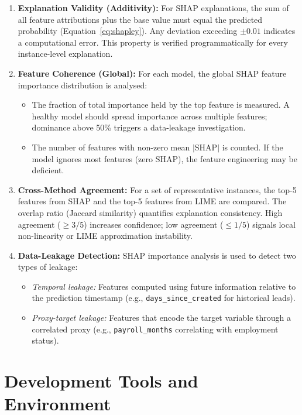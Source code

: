 \documentclass[12pt,a4paper]{report}
\begin{document}
\begin{enumerate}[label=\arabic*.]
  \item \textbf{Explanation Validity (Additivity):} For SHAP explanations, the sum of all feature attributions plus the base value must equal the predicted probability (Equation~\ref{eq:shapley}). Any deviation exceeding $\pm0.01$ indicates a computational error. This property is verified programmatically for every instance-level explanation.

  \item \textbf{Feature Coherence (Global):} For each model, the global SHAP feature importance distribution is analysed:
  \begin{itemize}
    \item The fraction of total importance held by the top feature is measured. A healthy model should spread importance across multiple features; dominance above 50\% triggers a data-leakage investigation.
    \item The number of features with non-zero mean $|\text{SHAP}|$ is counted. If the model ignores most features (zero SHAP), the feature engineering may be deficient.
  \end{itemize}

  \item \textbf{Cross-Method Agreement:} For a set of representative instances, the top-5 features from SHAP and the top-5 features from LIME are compared. The overlap ratio (Jaccard similarity) quantifies explanation consistency. High agreement ($\geq 3/5$) increases confidence; low agreement ($\leq 1/5$) signals local non-linearity or LIME approximation instability.

  \item \textbf{Data-Leakage Detection:} SHAP importance analysis is used to detect two types of leakage:
  \begin{itemize}
    \item \textit{Temporal leakage:} Features computed using future information relative to the prediction timestamp (e.g., \texttt{days\_since\_created} for historical leads).
    \item \textit{Proxy-target leakage:} Features that encode the target variable through a correlated proxy (e.g., \texttt{payroll\_months} correlating with employment status).
  \end{itemize}
\end{enumerate}


\section{Development Tools and Environment}
\label{sec:dev_tools}
\end{document}
